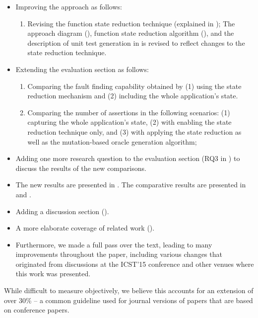 \begin{itemize}

\item Improving the approach as follows:

\begin{enumerate}
\item Revising the function state reduction technique (explained in ); The approach diagram (), function state reduction algorithm (), and the description of unit test generation in  is revised to reflect changes to the state reduction technique. 
\end{enumerate}

\item Extending the evaluation section as follows:

\begin{enumerate} 
\item Comparing the fault finding capability obtained by (1) using the state reduction mechanism and (2) including the whole application's state.
\item Comparing the number of assertions in the following scenarios:
(1) capturing the whole application's state, (2) with enabling the state reduction technique only, and (3) with applying the state reduction as well as the mutation-based oracle generation algorithm;
\end{enumerate}

\item Adding one more research question to the evaluation section (RQ3 in ) to discuss the results of the new comparisons. 

\item The new results are presented in . The comparative results are presented in  and .
\item Adding a discussion section (). 
\item A more elaborate coverage of related work ().
\item Furthermore, we made a full pass over the text,
   leading to many improvements throughout the paper,
   including various changes that originated from discussions at the
   ICST'15 conference and other venues where this work was presented. 

\end{itemize}

\medskip

While difficult to measure objectively, we believe this accounts for
   an extension of over 30\% -- a common guideline used for journal versions
   of papers that are based on conference papers.
